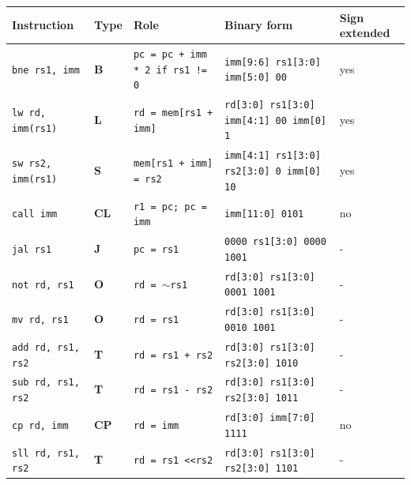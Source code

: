 \documentclass[a4paper,12pt]{article}
\begin{document}
\begin{landscape}
\begin{table}[]
\begin{tabular}{|l|l|l|l|l|}
\hline
\textbf{Instruction}      & \textbf{Type} & \textbf{Role}                                    & \textbf{Binary form}                                           & \textbf{Sign extended} \\ \hline
\texttt{bne rs1, imm}     & \textbf{B}    & \texttt{pc = pc + imm * 2 if rs1 != 0}           & \texttt{imm{[}9:6{]} rs1{[}3:0{]} imm{[}5:0{]} 00}             & yes           \\ \hline
\texttt{lw rd, imm(rs1)}  & \textbf{L}    & \texttt{rd = mem{[}rs1 + imm{]}}                 & \texttt{rd{[}3:0{]} rs1{[}3:0{]} imm{[}4:1{]} 00 imm{[}0{]} 1} & yes           \\ \hline
\texttt{sw rs2, imm(rs1)} & \textbf{S}    & \texttt{mem{[}rs1 + imm{]} = rs2}                & \texttt{imm{[}4:1{]} rs1{[}3:0{]} rs2{[}3:0{]} 0 imm{[}0{]} 10}& yes           \\ \hline
\texttt{call imm}         & \textbf{CL}   & \texttt{r1 = pc; pc = imm}                       & \texttt{imm{[}11:0{]} 0101}                                    & no            \\ \hline
\texttt{jal rs1}          & \textbf{J}    & \texttt{pc = rs1}                                & \texttt{0000 rs1{[}3:0{]} 0000 1001}                           & -             \\ \hline
\texttt{not rd, rs1}      & \textbf{O}    & \texttt{rd = $\sim$rs1}                          & \texttt{rd{[}3:0{]} rs1{[}3:0{]} 0001 1001}                    & -             \\ \hline 
 \texttt{mv rd, rs1}& \textbf{O}& \texttt{rd = rs1}& \texttt{rd{[}3:0{]} rs1{[}3:0{]} 0010 1001}&-\\\hline
\texttt{add rd, rs1, rs2} & \textbf{T}    & \texttt{rd = rs1 + rs2}                          & \texttt{rd{[}3:0{]} rs1{[}3:0{]} rs2{[}3:0{]} 1010}            & -             \\ \hline
\texttt{sub rd, rs1, rs2} & \textbf{T}    & \texttt{rd = rs1 - rs2}                          & \texttt{rd{[}3:0{]} rs1{[}3:0{]} rs2{[}3:0{]} 1011}            & -             \\ \hline
\texttt{cp rd, imm}       & \textbf{CP}   & \texttt{rd = imm}                                & \texttt{rd{[}3:0{]} imm{[}7:0{]} 1111}                         & no            \\ \hline
\texttt{sll rd, rs1, rs2} & \textbf{T}    & \texttt{rd = rs1 \textless{}\textless rs2}       & \texttt{rd{[}3:0{]} rs1{[}3:0{]} rs2{[}3:0{]} 1101}            & -             \\ \hline

\end{tabular}
\end{table}
\end{landscape}
\end{document}
